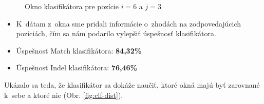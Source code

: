 \documentclass[myposter,portrait]{sciposter}
\begin{document}
\begin{multicols*}{3}
\begin{figure}
    \centering
    \label{fig:window}
    \caption{Okno klasifikátora pre pozície $i = 6$ a $j = 3$}
\end{figure}

\begin{itemize}
    \item K~dátam z~okna sme pridali informácie o~zhodách na zodpovedajúcich pozíciách, čím sa nám podarilo vylepšiť úspešnosť klasifikátora.
    \item Úspešnosť Match klasifikátora: \textbf{84,32\%}
    \item Úspešnosť Indel klasifikátora: \textbf{76,46\%}
\end{itemize}

Ukázalo sa teda, že klasifikátor sa dokáže naučiť, ktoré okná majú byť zarovnané k~sebe a ktoré nie (Obr. \ref{fig:clf-dist}).


\end{multicols*}
\end{document}
